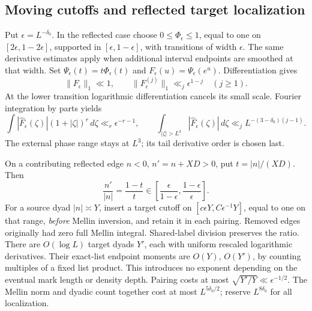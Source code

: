 \subsection{Moving cutoffs and reflected target localization}
Put \(\epsilon=L^{-\delta_0}\). In the reflected case choose
\(0\le\Phi_\epsilon\le1\), equal to one on
\([2\epsilon,1-2\epsilon]\), supported in
\([\epsilon,1-\epsilon]\), with transitions of width \(\epsilon\).
The same derivative estimates apply when additional interval endpoints
are smoothed at that width. Set
\(\Psi_\epsilon(t)=t\Phi_\epsilon(t)\) and
\(F_\epsilon(u)=\Psi_\epsilon(e^u)\). Differentiation gives
\[
 \|F_\epsilon\|_1\ll1,\qquad
 \|F_\epsilon^{(j)}\|_1\ll_j\epsilon^{1-j}\quad(j\ge1).
\]
At the lower transition logarithmic differentiation cancels its small
scale. Fourier integration by parts yields
\begin{equation}\label{eq:mellin-budget}
 \int|\widehat F_\epsilon(\zeta)|(1+|\zeta|)^r\,d\zeta
 \ll_r\epsilon^{-r-1},\qquad
 \int_{|\zeta|>L^3}|\widehat F_\epsilon(\zeta)|\,d\zeta
 \ll_j L^{-(3-\delta_0)(j-1)}.
\end{equation}
The external phase range stays at \(L^3\); its tail derivative order
is chosen last.

On a contributing reflected edge \(n<0\), \(n'=n+XD>0\),
put \(t=|n|/(XD)\). Then
\begin{equation}\label{eq:two-sided-localization}
 \frac{n'}{|n|}=\frac{1-t}{t}
 \in\left[\frac\epsilon{1-\epsilon},
                \frac{1-\epsilon}{\epsilon}\right].
\end{equation}
For a source dyad \(|n|\asymp Y\), insert a target cutoff on
\([c\epsilon Y,C\epsilon^{-1}Y]\), equal to one on that range,
\emph{before} Mellin inversion, and retain it in each pairing.
Removed edges originally had zero full Mellin integral.
Shared-label division preserves the ratio. There are \(O(\log L)\)
target dyads \(Y'\), each with uniform rescaled logarithmic derivatives.
Their exact-list endpoint moments are \(O(Y)\), \(O(Y')\), by
counting multiples of a fixed list product. This introduces no
exponent depending on the eventual mark length or density depth.
Pairing costs at most \(\sqrt{Y'/Y}\ll\epsilon^{-1/2}\).
The Mellin norm and dyadic count together cost at most
\(L^{5\delta_0/2}\); reserve \(L^{8\delta_0}\) for all localization.

